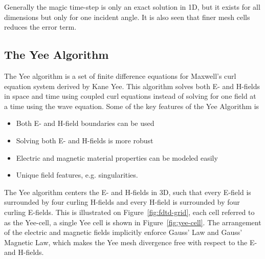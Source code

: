 Generally the magic time-step is only an exact solution in 1D, but it exists for all dimensions but only for one incident angle. It is also seen that finer mesh cells reduces the error term.  

\subsection{The Yee Algorithm}
The Yee algorithm is a set of finite difference equations for Maxwell's curl equation system derived by Kane Yee. This algorithm solves both E- and H-fields in space and time using coupled curl equations instead of solving for one field at a time using the wave equation. Some of the key features of the Yee Algorithm is

\begin{itemize}
\item Both E- and H-field boundaries can be used
\item Solving both E- and H-fields is more robust 
\item Electric and magnetic material properties can be modeled easily
\item Unique field features, e.g. singularities. 
\end{itemize}
The Yee algorithm centers the E- and H-fields in 3D, such that every E-field is surrounded by four curling H-fields and every H-field is surrounded by four curling E-fields. This is illustrated on Figure~\ref{fig:fdtd-grid}, each cell referred to as the Yee-cell, a single Yee cell is shown in Figure~\ref{fig:yee-cell}. The arrangement of the electric and magnetic fields implicitly enforce Gauss' Law and Gauss' Magnetic Law, which makes the Yee mesh divergence free with respect to the E- and H-fields.  

